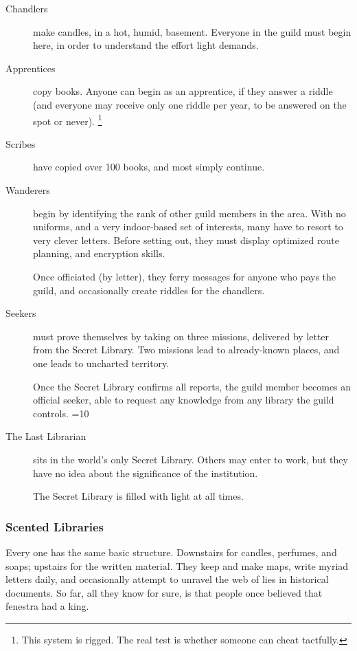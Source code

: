 \begin{multicols}{2}
\begin{description}
  \item[Chandlers]
  make candles, in a hot, humid, basement.
  Everyone in the guild must begin here, in order to understand the effort light demands.
  \item[Apprentices]
  copy books.
  Anyone can begin as an apprentice, if they answer a riddle (and everyone may receive only one riddle per year, to be answered on the spot or never).%
  \footnote{This system is rigged. The real test is whether someone can cheat tactfully.}
  \item[Scribes]
  have copied over 100 books, and most simply continue.
  \item[Wanderers]
  \label{knowledgeWanderer}%
  begin by identifying the rank of other guild members in the area.
  With no uniforms, and a very indoor-based set of interests, many have to resort to very clever letters.
  Before setting out, they must display optimized route planning, and encryption skills.

  Once officiated (by letter), they ferry messages for anyone who pays the guild, and occasionally create riddles for the chandlers.
  \item[Seekers]
  must prove themselves by taking on three missions, delivered by letter from the Secret Library.
  Two missions lead to already-known places, and one leads to uncharted territory.

  Once the Secret Library confirms all reports, the guild member becomes an official seeker, able to request any knowledge from any library the guild controls.
  \ifnum\value{season}=10
  \item[The Last Librarian]
  sits in the world's only Secret Library.
  Others may enter to work, but they have no idea about the significance of the institution.

  The Secret Library is filled with light at all times.
  \fi
\end{description}

\subsubsection{Scented Libraries}

Every one has the same basic structure.
Downstairs for candles, perfumes, and soaps; upstairs for the written material.
They keep and make maps, write myriad letters daily, and occasionally attempt to unravel the web of lies in historical documents.
So far, all they know for sure, is that people once believed that \gls{fenestra} had a king.

\end{multicols}

\begin{figure*}[b!]
  \solarSystem
\end{figure*}

